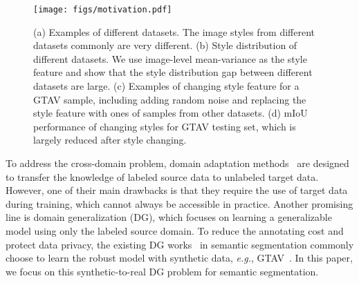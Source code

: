 \documentclass{article}
\begin{document}
\begin{figure*}[!t]
\centering
\texttt{[image: figs/motivation.pdf]}
\caption{(a) Examples of different datasets. The image styles from different datasets commonly are very different. (b) Style distribution of different datasets. We use image-level mean-variance as the style feature and show that the style distribution gap between different datasets are large. (c) Examples of changing style feature for a GTAV sample, including adding random noise and replacing the style feature with ones of samples from other datasets. (d) mIoU performance of changing styles for GTAV testing set, which is largely reduced after style changing.}
\label{fig:motivation}
\end{figure*}


To address the cross-domain problem, domain adaptation methods~\cite{luo2019taking,zhang2021prototypical} are designed to transfer the knowledge of labeled source data to unlabeled target data. However, one of their main drawbacks is that they require the use of target data during training, which cannot always be accessible in practice.
Another promising line is domain generalization (DG), which focuses on learning a generalizable model using only the labeled source domain.
To reduce the annotating cost and protect data privacy, the existing DG works~\cite{robustnet,DRPC,zhao2022style} in semantic segmentation commonly choose to learn the robust model with synthetic data, \textit{e.g.}, GTAV~\cite{gtav}. In this paper, we focus on this synthetic-to-real DG problem for semantic segmentation.
\end{document}
